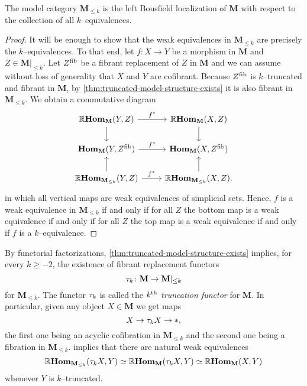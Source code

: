 \begin{corollary}\label{cor:weak-equiv-level}
  The model category \(\mathbf M_{\leq k}\) is the left Bousfield localization of \(\mathbf M\) with respect to the collection of all \(k\)--equivalences.
\end{corollary}
\begin{proof}
  It will be enough to show that the weak equivalences in \(\mathbf M_{\leq k}\) are precisely the \(k\)--equivalences. To that end, let \(f\colon X\to Y\) be a morphism in \(\mathbf M\) and \(Z\in\mathbf M|_{\leq k}\). Let \(Z^{\operatorname{\textnormal{fib}}}\) be a fibrant replacement of \(Z\) in \(\mathbf M\) and we can assume without loss of generality that \(X\) and \(Y\) are cofibrant. Because \(Z^{\operatorname{\textnormal{fib}}}\) is \(k\)--truncated and fibrant in \(\mathbf M\), by \autoref{thm:truncated-model-structure-exists} it is also fibrant in \(\mathbf M_{\leq k}\). We obtain a commutative diagram
  \[
  \begin{tikzcd}
    \RHom_{\mathbf M}(Y, Z) \arrow[r, "f^{*}"] \arrow[d] & \RHom_{\mathbf M}(X, Z) \arrow[d] \\
    \Hom_{\mathbf M}(Y, Z^{\fib}) \arrow[r, "f^{*}"] & \Hom_{\mathbf M}(X, Z^{\fib}) \\
    \RHom_{\mathbf M_{\leq k}}(Y, Z) \arrow[r, "f^{*}"] \arrow[u] & \RHom_{\mathbf M_{\leq k}}(X, Z). \arrow[u]
  \end{tikzcd}
  \]
  in which all vertical maps are weak equivalences of simplicial sets. Hence, \(f\) is a weak equivalence in \(\mathbf M_{\leq k}\) if and only if for all \(Z\) the bottom map is a weak equivalence if and only if for all \(Z\) the top map is a weak equivalence if and only if \(f\) is a \(k\)--equivalence.
\end{proof}

By functorial factorizations, \autoref{thm:truncated-model-structure-exists} implies, for every \(k\geq -2\), the existence of fibrant replacement functors
\[\tau_{k}\colon \mathbf{M}\to\mathbf{M}|_{\leq k}\]
for \(\mathbf M_{\leq k}\). The functor \(\tau_{k}\) is called the \emph{\(k\textsuperscript{th}\) truncation functor} for \(\mathbf{M}\). In particular, given any object \(X\in\mathbf{M}\) we get maps
\[X\to \tau_{k} X\to *,\]
the first one being an acyclic cofibration in \(\mathbf{M}_{\leq k}\) and the second one being a fibration in \(\mathbf{M}_{\leq k}\).  implies that there are natural weak equivalences
\[\operatorname{\mathbb{R}\textnormal{\bfseries Hom}}_{\mathbf M_{\leq k}}(\tau_{k} X, Y)\simeq \operatorname{\mathbb{R}\textnormal{\bfseries Hom}}_{\mathbf M}(\tau_{k} X, Y) \simeq \operatorname{\mathbb{R}\textnormal{\bfseries Hom}}_{\mathbf M}(X, Y)\]
whenever \(Y\) is \(k\)--truncated.

